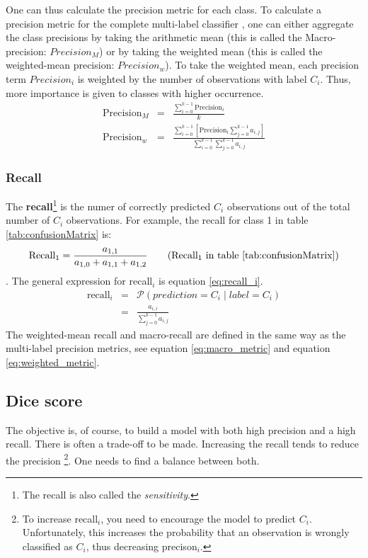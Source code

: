\par{
    One can thus calculate the precision metric for each class. 
    To calculate a precision metric for the complete multi-label classifier
    , one can either aggregate the class precisions by taking the arithmetic mean (this is called the Macro-precision: $Precision_M$) or by taking the weighted mean (this is called the weighted-mean precision: $Precision_w$).
    To take the weighted mean, each precision term $Precision_i$ is weighted by the number of observations with label $C_i$. Thus, more importance is given to classes with higher occurrence. 
    \begin{eqnarray}
        \text{Precision}_M &=& \frac{\sum_{i=0}^{k-1} \text{Precision}_i}{k}  \label{eq:macro_metric}\\
        \text{Precision}_w &=& \frac{\sum_{i=0}^{k-1} \left[ \text{Precision}_i \sum_{j=0}^{k-1} a_{i,j} \right] }{\sum_{i=0}^{k-1} \sum_{j=0}^{k-1} a_{i,j} }  \label{eq:weighted_metric}
    \end{eqnarray}
}
\subsubsection{Recall}
\par{
    The \textbf{recall}\footnote{The recall is also called the \textit{sensitivity}.} is the numer of correctly predicted $C_i$ observations out of the total number of $C_i$ observations.
    For example, the recall for class 1 in table \ref{tab:confusionMatrix} is:
    \begin{equation}
        \text{Recall}_1 = \frac{a_{1,1}}{a_{1,0} + a_{1,1} + a_{1,2}} \tag{Recall$_1$ in table \ref{tab:confusionMatrix}}
    \end{equation}.
    The general expression for recall$_i$ is equation \ref{eq:recall_i}.
    \begin{eqnarray}
        \text{recall}_i &=& \mathcal{P} \left( prediction = C_i \mid label = C_i \right) \\
        &=& \frac{a_{i, i}}{\sum_{j=0}^{k-1} a_{i,j}} \label{eq:recall_i}
    \end{eqnarray}
    The weighted-mean recall and macro-recall are defined in the same way as the multi-label precision metrics, see equation \ref{eq:macro_metric} and equation \ref{eq:weighted_metric}.
}
\subsection{Dice score\label{sec:dice}}
\par{
    The objective is, of course, to build a model with both high precision and a high recall.
    There is often a trade-off to be made. 
    Increasing the recall tends to reduce the precision
    \footnote{To increase recall$_i$, you need to encourage the model to predict $C_i$. Unfortunately, this increases the probability that an observation is wrongly classified as $C_i$, thus decreasing precison$_i$.}.
    One needs to find a balance between both.
}

